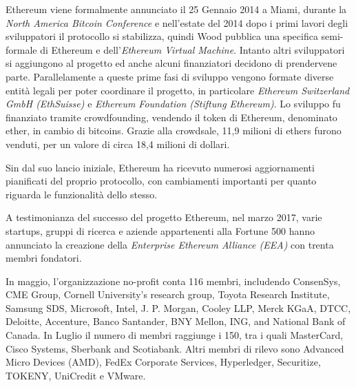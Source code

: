 Ethereum viene formalmente annunciato il 25 Gennaio 2014 a Miami, durante la \textit{North America Bitcoin Conference}  e nell'estate del 2014 dopo i primi lavori degli sviluppatori il protocollo si stabilizza, quindi Wood pubblica una specifica semi-formale di Ethereum e dell'\textit{Ethereum Virtual Machine}\cite{K22}. Intanto altri sviluppatori si aggiungono al progetto ed anche alcuni finanziatori decidono di prendervene parte.
Parallelamente a queste prime fasi di sviluppo vengono formate diverse entità legali per poter coordinare il progetto, in particolare \textit{Ethereum Switzerland GmbH (EthSuisse)} e \textit{Ethereum Foundation (Stiftung Ethereum)}. Lo sviluppo fu finanziato tramite crowdfounding, vendendo il token di Ethereum, denominato ether, in cambio di bitcoins. Grazie alla crowdsale, 11,9 milioni di ethers furono venduti, per un valore di circa 18,4 milioni di dollari. 

Sin dal suo lancio iniziale, Ethereum ha ricevuto numerosi aggiornamenti pianificati del proprio protocollo, con cambiamenti importanti per quanto riguarda le funzionalità dello stesso. 

A testimonianza del successo del progetto Ethereum, nel marzo 2017, varie startups, gruppi di ricerca e aziende appartenenti alla Fortune 500 hanno annunciato la creazione della \textit{Enterprise Ethereum Alliance (EEA)} con trenta membri fondatori. 

In maggio, l'organizzazione no-profit conta 116 membri, includendo ConsenSys, CME Group, Cornell University's research group, Toyota Research Institute, Samsung SDS, Microsoft, Intel, J. P. Morgan, Cooley LLP, Merck KGaA, DTCC, Deloitte, Accenture, Banco Santander, BNY Mellon, ING, and National Bank of Canada.
In Luglio il numero di membri raggiunge i 150, tra i quali MasterCard, Cisco Systems, Sberbank and Scotiabank. Altri membri di rilevo sono Advanced Micro Devices (AMD), FedEx Corporate Services, Hyperledger, Securitize, TOKENY, UniCredit e VMware.


